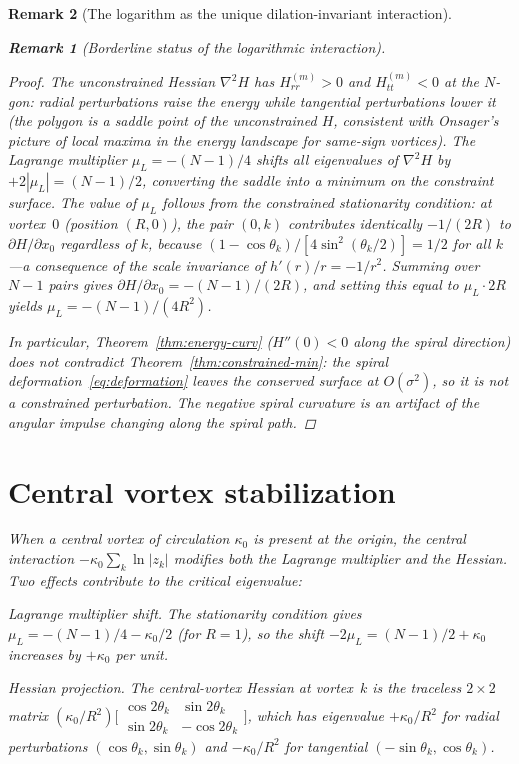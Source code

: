 \documentclass[12pt, a4paper]{article}
\newtheorem{remark}{Remark}[section]
\numberwithin{equation}{section}
\begin{document}
\begin{remark}[The logarithm as the unique dilation-invariant interaction]
\begin{remark}[Borderline status of the logarithmic interaction]
\begin{proof}
The unconstrained Hessian $\nabla^2 H$ has $H_{rr}^{(m)} > 0$ and
$H_{tt}^{(m)} < 0$ at the $N$-gon: radial perturbations raise the
energy while tangential perturbations lower it (the polygon is a
saddle point of the unconstrained $H$, consistent with Onsager's
picture of local maxima in the energy landscape for same-sign
vortices).  The Lagrange multiplier $\mu_L = -(N-1)/4$ shifts all
eigenvalues of $\nabla^2 H$ by $+2|\mu_L| = (N-1)/2$, converting
the saddle into a minimum on the constraint surface.  The value of
$\mu_L$ follows from the constrained stationarity condition: at
vortex~$0$ (position $(R,0)$), the pair $(0,k)$ contributes
identically $-1/(2R)$ to $\partial H/\partial x_0$ regardless of
$k$, because $(1-\cos\theta_k)/[4\sin^2(\theta_k/2)] = 1/2$ for
all $k$---a consequence of the scale invariance of $h'(r)/r =
-1/r^2$.  Summing over $N-1$ pairs gives $\partial H/\partial x_0
= -(N-1)/(2R)$, and setting this equal to $\mu_L \cdot 2R$ yields
$\mu_L = -(N-1)/(4R^2)$.

In particular, Theorem~\ref{thm:energy-curv} ($H''(0) < 0$ along
the spiral direction) does not contradict Theorem~\ref{thm:constrained-min}:
the spiral deformation~\eqref{eq:deformation} leaves the conserved
surface at $O(\sigma^2)$, so it is not a constrained perturbation.
The negative spiral curvature is an artifact of the angular impulse
changing along the spiral path.
\end{proof}


\section{Central vortex stabilization}
\label{sec:central-vortex}

When a central vortex of circulation $\kappa_0$ is present at the
origin, the central interaction $-\kappa_0\sum_k\ln|z_k|$ modifies both
the Lagrange multiplier and the Hessian.  Two effects contribute to the
critical eigenvalue:

\emph{Lagrange multiplier shift.}  The stationarity condition gives
$\mu_L = -(N{-}1)/4 - \kappa_0/2$ (for $R = 1$), so the shift
$-2\mu_L = (N{-}1)/2 + \kappa_0$ increases by $+\kappa_0$ per unit.

\emph{Hessian projection.}  The central-vortex Hessian at vortex~$k$
is the traceless $2 \times 2$ matrix
$(\kappa_0/R^2)\bigl[\begin{smallmatrix}\cos 2\theta_k & \sin 2\theta_k
\\ \sin 2\theta_k & -\cos 2\theta_k\end{smallmatrix}\bigr]$,
which has eigenvalue $+\kappa_0/R^2$ for radial perturbations
$(\cos\theta_k, \sin\theta_k)$ and $-\kappa_0/R^2$ for tangential
$(-\sin\theta_k, \cos\theta_k)$.


\end{remark}
\end{remark}
\end{document}
